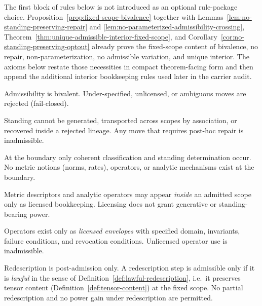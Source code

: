 The first block of rules below is not introduced as an optional rule-package choice. Proposition~\ref{prop:fixed-scope-bivalence} together with Lemmas~\ref{lem:no-standing-preserving-repair} and \ref{lem:no-parameterized-admissibility-crossing}, Theorem~\ref{thm:unique-admissible-interior-fixed-scope}, and Corollary~\ref{cor:no-standing-preserving-optout} already prove the fixed-scope content of bivalence, no repair, non-parameterization, no admissible variation, and unique interior. The axioms below restate those necessities in compact theorem-facing form and then append the additional interior bookkeeping rules used later in the carrier audit.

\begin{axiom}\label{ax:failclosed}
Admissibility is bivalent. Under-specified, unlicensed, or ambiguous moves are rejected (fail-closed).
\end{axiom}

\begin{axiom}\label{ax:impossibility}
Standing cannot be generated, transported across scopes by association, or recovered inside a rejected
lineage. Any move that requires post-hoc repair is inadmissible.
\end{axiom}

\begin{axiom}\label{ax:ametric}
At the boundary only coherent classification and standing determination occur. No metric notions
(norms, rates), operators, or analytic mechanisms exist at the boundary.
\end{axiom}

\begin{axiom}\label{ax:lmetric}
Metric descriptors and analytic operators may appear \emph{inside} an admitted scope only as licensed
bookkeeping. Licensing does not grant generative or standing-bearing power.
\end{axiom}

\begin{axiom}\label{ax:envelopes}
Operators exist only as \emph{licensed envelopes} with specified domain, invariants, failure conditions,
and revocation conditions. Unlicensed operator use is inadmissible.
\end{axiom}

\begin{axiom}\label{ax:redescription}
Redescription is post-admission only.
A redescription step is admissible only if it is \emph{lawful} in the sense of
Definition~\ref{def:lawful-redescription}, i.e.\ it preserves tensor content
(Definition~\ref{def:tensor-content}) at the fixed scope.
No partial redescription and no power gain under redescription are permitted.
\end{axiom}

